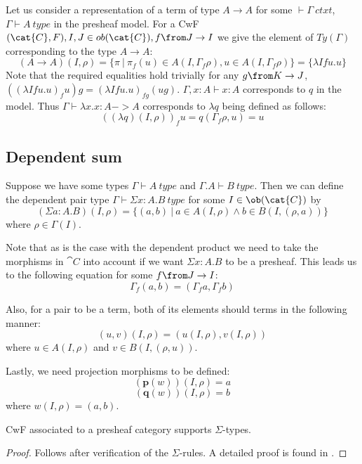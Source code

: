 \begin{example}
  Let us consider a representation of a term of type $A \to A$ for some $\vdash
  \Gamma~ctxt$, $\Gamma \vdash A~type$ in the presheaf model. For a CwF $(\cat{C}, F), I, J \in ob(\cat{C}), f \from J \to I$ we give the
  element of $\mathit{Ty}(\Gamma)$ corresponding to the type $A \to A$:
  \[
    (A \to A)(I, \rho) = \{\pi~|~\pi_f(u) \in A(I, \Gamma_f \rho), u \in A(I, \Gamma_f \rho)\} = \{\lambda I f u.u\}
  \]
  Note that the required equalities hold trivially for any $g \from K \to J$,
  $((\lambda I f u.u)_f u) g = (\lambda I f u.u)_{fg} (ug)$. $\Gamma, x : A
  \vdash x : A$ corresponds to $q$ in the model. Thus $\Gamma \vdash \lambda
  x.x : A -> A$ corresponds to $\lambda q$ being defined as follows:
  \[
    ((\lambda q) (I, \rho))_f u = q(\Gamma_f \rho, u) = u
  \]
\end{example}

\subsection*{Dependent sum}
Suppose we have some types $\Gamma \vdash A~type$ and $\Gamma.A \vdash B~type$.
Then we can define the dependent pair type $\Gamma \vdash \Sigma x:A.B~type$
for some $I \in \ob(\cat{C})$ by
\[
  (\Sigma a :A. B)(I, \rho) = \{(a, b)~|~a \in A(I, \rho) \land b \in B(I, (\rho, a))\}
\]
where $\rho \in \Gamma(I)$.

Note that as is the case with the dependent product we need to take the
morphisms in $\cat{C}$ into account if we want $\Sigma x:A.B$ to be a presheaf.
This leads us to the following equation for some $f \from J \to I$:
\[
  \Gamma_f(a, b) = (\Gamma_f a, \Gamma_f b)
\]

Also, for a pair to be a term, both of its elements should terms in the
following manner:
\[
  (u, v)(I, \rho) = (u(I, \rho), v(I, \rho))
\]
where $u \in A(I, \rho)$ and $v \in B(I, (\rho, u))$.

Lastly, we need projection morphisms to be defined:
\[
  (\mathbf{p}(w))(I, \rho) = a
\]
\[
  (\mathbf{q}(w))(I, \rho) = b
\]
where $w(I, \rho) = (a, b)$.

\begin{lemma}
  CwF associated to a presheaf category supports $\Sigma$-types.
  \begin{proof}
    Follows after verification of the $\Sigma$-rules. A detailed proof is found
    in \cite{Hofmann}.
  \end{proof}
\end{lemma}





